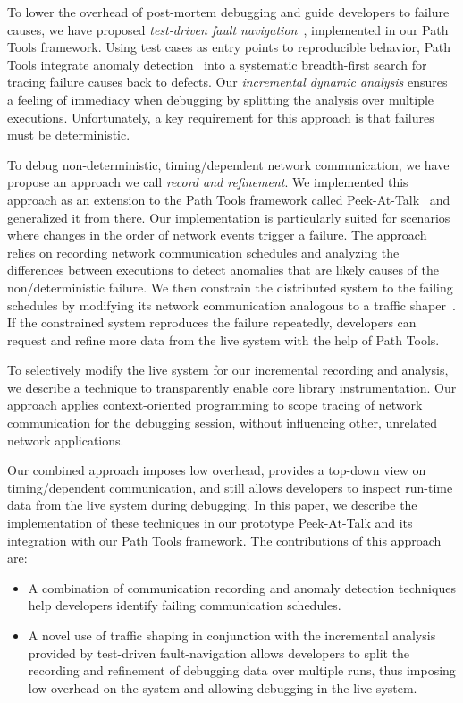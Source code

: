 \documentclass[preprint,3p]{elsarticle}
\newcommand{\toolname}{Peek-At-Talk\xspace}
\begin{document}
To lower the overhead of post-mortem debugging and guide developers to failure
causes, we have proposed \emph{test-driven fault navigation}~\cite{Perscheid13},
implemented in our Path Tools framework. Using test cases as entry points to
reproducible behavior, Path Tools integrate anomaly
detection~\cite{Jones2002Vti,Ernst2007Tds} into a systematic breadth-first
search for tracing failure causes back to defects. Our \emph{incremental dynamic
  analysis} ensures a feeling of immediacy when debugging by splitting the
analysis over multiple executions. Unfortunately, a key requirement for this
approach is that failures must be deterministic.

To debug non-deterministic, timing\-/dependent network communication, we have
propose an approach we call \emph{record and refinement}. We implemented this
approach as an extension to the Path Tools framework called
\toolname~\cite{felgentreff2013wasdett} and generalized it from there.  Our
implementation is particularly suited for scenarios where changes in the order
of network events trigger a failure. The approach relies on recording network
communication schedules and analyzing the differences between executions to
detect anomalies that are likely causes of the non\-/deterministic failure. We
then constrain the distributed system to the failing schedules by modifying its
network communication analogous to a traffic shaper~\cite{IetfShaper}. If the
constrained system reproduces the failure repeatedly, developers can request and
refine more data from the live system with the help of Path Tools.

To selectively modify the live system for our incremental recording and
analysis, we describe a technique to transparently enable core library
instrumentation. Our approach applies context-oriented programming to scope
tracing of network communication for the debugging session, without influencing
other, unrelated network applications.

Our combined approach imposes low overhead, provides a top-down view on
timing\-/dependent communication, and still allows developers to inspect
run-time data from the live system during debugging. In this paper, we describe
the implementation of these techniques in our prototype \toolname and its
integration with our Path Tools framework. The contributions of this approach are:
\begin{itemize}
\item A combination of communication recording and anomaly detection techniques
  help developers identify failing communication schedules.
\item A novel use of traffic shaping in conjunction with the incremental
  analysis provided by test-driven fault-navigation allows developers to split
  the recording and refinement of debugging data over multiple runs, thus
  imposing low overhead on the system and allowing debugging in the live system.
\end{itemize}
\end{document}
